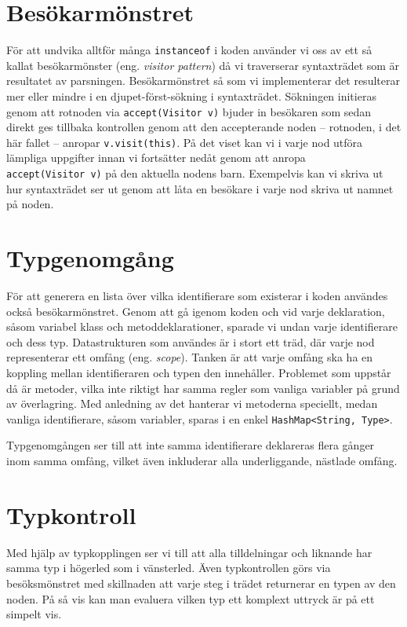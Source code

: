 \documentclass[a4paper,11pt]{article}
\newcommand{\trans}[2][eng.]{(#1 \emph{#2})}
\renewcommand{\*}[0]{\cdot}
\begin{document}
\section*{Besökarmönstret}

För att undvika alltför många \texttt{instanceof} i koden använder vi oss av
ett så kallat besökarmönster \trans{visitor pattern} då vi traverserar
syntaxträdet som är resultatet av parsningen. Besökarmönstret så som vi
implementerar det resulterar mer eller mindre i en djupet-först-sökning i
syntaxträdet. Sökningen initieras genom att rotnoden via
\texttt{accept(Visitor~v)} bjuder in besökaren som sedan direkt ges tillbaka
kontrollen genom att den accepterande noden -- rotnoden, i det här fallet --
anropar \texttt{v.visit(this)}. På det viset kan vi i varje nod utföra lämpliga
uppgifter innan vi fortsätter nedåt genom att anropa \texttt{accept(Visitor~v)}
på den aktuella nodens barn. Exempelvis kan vi skriva ut hur syntaxträdet ser
ut genom att låta en besökare i varje nod skriva ut namnet på noden.

\section*{Typgenomgång}

För att generera en lista över vilka identifierare som existerar i koden
användes också besökarmönstret. Genom att gå igenom koden och vid varje
deklaration, såsom variabel klass och metoddeklarationer, sparade vi undan
varje identifierare och dess typ. Datastrukturen som användes är i stort ett
träd, där varje nod representerar ett omfång \trans{scope}. Tanken är att varje
omfång ska ha en koppling mellan identifieraren och typen den innehåller.
Problemet som uppstår då är metoder, vilka inte riktigt har samma regler som
vanliga variabler på grund av överlagring. Med anledning av det hanterar vi
metoderna speciellt, medan vanliga identifierare, såsom variabler, sparas i en
enkel \texttt{HashMap<String, Type>}.

Typgenomgången ser till att inte samma identifierare deklareras flera gånger
inom samma omfång, vilket även inkluderar alla underliggande, nästlade omfång.

\section*{Typkontroll}

Med hjälp av typkopplingen ser vi till att alla tilldelningar och liknande har
samma typ i högerled som i vänsterled. Även typkontrollen görs via
besöksmönstret med skillnaden att varje steg i trädet returnerar en typen av
den noden. På så vis kan man evaluera vilken typ ett komplext uttryck är på ett
simpelt vis.
\end{document}
